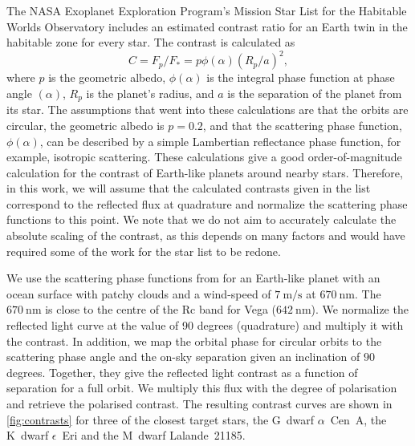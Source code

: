 \documentclass[
    usenatbib,
]{mnras}
\begin{document}
The NASA Exoplanet Exploration Program’s Mission Star List for the Habitable Worlds Observatory includes an estimated contrast ratio for an Earth twin in the habitable zone for every star. 
%
The contrast is calculated as 
\begin{equation}
C = F_p/F_* = p \phi (\alpha) (R_p/a)^2,
\end{equation}
where $p$ is the geometric albedo, $\phi (\alpha)$ is the integral phase function at phase angle $(\alpha)$, $R_p$ is the planet’s radius, and $a$ is the separation of the planet from its star. 
%
The assumptions that went into these calculations are that the orbits are circular, the geometric albedo is $p=0.2$, and that the scattering phase function, $\phi(\alpha)$, can be described by a simple Lambertian reflectance phase function, for example, isotropic scattering.
%
These calculations give a good order-of-magnitude calculation for the contrast of Earth-like planets around nearby stars.
%
Therefore, in this work, we will assume that the calculated contrasts given in the list correspond to the reflected flux at quadrature and normalize the scattering phase functions to this point.
%
We note that we do not aim to accurately calculate the absolute scaling of the contrast, as this depends on many factors and would have required some of the work for the star list to be redone.

We use the scattering phase functions from \cite{treesandstam2019} for an Earth-like planet with an ocean surface with patchy clouds and a wind-speed of $\SI{7}{\meter\per\second}$ at $\SI{670}{\nano\meter}$.
%
The $\SI{670}{\nano\meter}$ is close to the centre of the Rc band for Vega ($\SI{642}{\nano\meter}$). 
%
We normalize the reflected light curve at the value of 90 degrees (quadrature) and multiply it with the contrast.
%
In addition, we map the orbital phase for circular orbits to the scattering phase angle and the on-sky separation given an inclination of $90$ degrees.
%
Together, they give the reflected light contrast as a function of separation for a full orbit.
%
We multiply this flux with the degree of polarisation and retrieve the polarised contrast.
%
The resulting contrast curves are shown in \cref{fig:contrasts} for three of the closest target stars, the G~dwarf $\alpha$~Cen~A, the K~dwarf $\epsilon$~Eri and the M~dwarf Lalande~21185.
\end{document}
